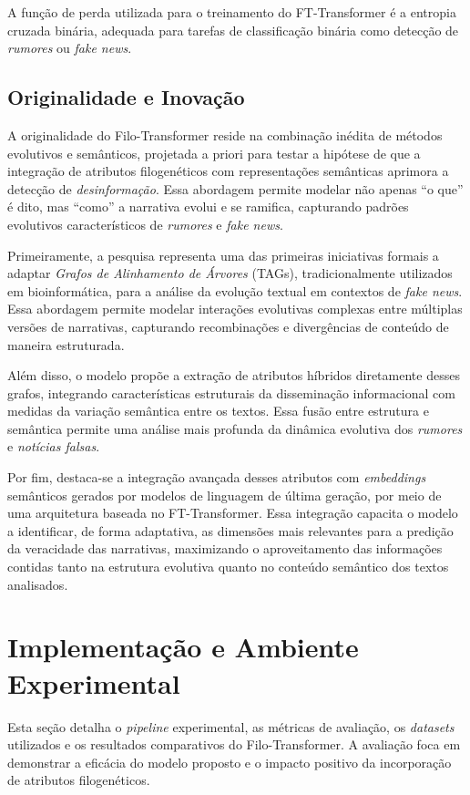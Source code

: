 \documentclass[12pt]{article}
\begin{document}
A função de perda utilizada para o treinamento do FT-Transformer é a entropia cruzada binária, adequada para tarefas de classificação binária como detecção de \textit{rumores} ou \textit{fake news}.

\subsection{Originalidade e Inovação} \label{subsec:originalidade-inovacao}
A originalidade do Filo-Transformer reside na combinação inédita de métodos evolutivos e semânticos, projetada a priori para testar a hipótese de que a integração de atributos filogenéticos com representações semânticas aprimora a detecção de \textit{desinformação}. Essa abordagem permite modelar não apenas ``o que'' é dito, mas ``como'' a narrativa evolui e se ramifica, capturando padrões evolutivos característicos de \textit{rumores} e \textit{fake news}.

Primeiramente, a pesquisa representa uma das primeiras iniciativas formais a adaptar \textit{Grafos de Alinhamento de Árvores} (TAGs), tradicionalmente utilizados em bioinformática, para a análise da evolução textual em contextos de \textit{fake news}. Essa abordagem permite modelar interações evolutivas complexas entre múltiplas versões de narrativas, capturando recombinações e divergências de conteúdo de maneira estruturada.

Além disso, o modelo propõe a extração de atributos híbridos diretamente desses grafos, integrando características estruturais da disseminação informacional com medidas da variação semântica entre os textos. Essa fusão entre estrutura e semântica permite uma análise mais profunda da dinâmica evolutiva dos \textit{rumores} e \textit{notícias falsas}.

Por fim, destaca-se a integração avançada desses atributos com \textit{embeddings} semânticos gerados por modelos de linguagem de última geração, por meio de uma arquitetura baseada no FT-Transformer. Essa integração capacita o modelo a identificar, de forma adaptativa, as dimensões mais relevantes para a predição da veracidade das narrativas, maximizando o aproveitamento das informações contidas tanto na estrutura evolutiva quanto no conteúdo semântico dos textos analisados.

\section{Implementação e Ambiente Experimental} \label{sec:implementacao}
Esta seção detalha o \textit{pipeline} experimental, as métricas de avaliação, os \textit{datasets} utilizados e os resultados comparativos do Filo-Transformer. A avaliação foca em demonstrar a eficácia do modelo proposto e o impacto positivo da incorporação de atributos filogenéticos.
\end{document}
